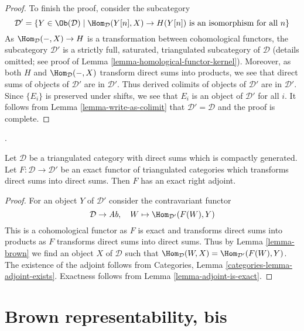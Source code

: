 \begin{proof}
\medskip\noindent
To finish the proof, consider the subcategory
$$
\mathcal{D}' =
\{Y \in \Ob(\mathcal{D}) \mid \Hom_\mathcal{D}(Y[n], X) \to H(Y[n])
\text{ is an isomorphism for all }n\}
$$
As $\Hom_\mathcal{D}(-, X) \to H$ is a transformation between
cohomological functors,
the subcategory $\mathcal{D}'$ is a strictly full, saturated, triangulated
subcategory of $\mathcal{D}$ (details omitted; see proof of
Lemma \ref{lemma-homological-functor-kernel}). Moreover, as both
$H$ and $\Hom_\mathcal{D}(-, X)$ transform direct sums into products,
we see that direct sums of objects of $\mathcal{D}'$ are in $\mathcal{D}'$.
Thus derived colimits of objects of $\mathcal{D}'$ are in $\mathcal{D}'$.
Since $\{E_i\}$ is preserved under shifts, we see that $E_i$
is an object of $\mathcal{D}'$ for all $i$. It follows from
Lemma \ref{lemma-write-as-colimit} that $\mathcal{D}' = \mathcal{D}$
and the proof is complete.
\end{proof}

\begin{proposition}
\label{proposition-brown}
\begin{reference}
\cite[Theorem 4.1]{Neeman-Grothendieck}.
\end{reference}
Let $\mathcal{D}$ be a triangulated category with direct sums which is
compactly generated. Let $F : \mathcal{D} \to \mathcal{D}'$ be an
exact functor of triangulated categories which transforms direct sums
into direct sums. Then $F$ has an exact right adjoint.
\end{proposition}

\begin{proof}
For an object $Y$ of $\mathcal{D}'$ consider the contravariant functor
$$
\mathcal{D} \to \textit{Ab},\quad W \mapsto \Hom_{\mathcal{D}'}(F(W), Y)
$$
This is a cohomological functor as $F$ is exact and transforms direct sums
into products as $F$ transforms direct sums into direct sums. Thus by
Lemma \ref{lemma-brown} we find an object $X$ of $\mathcal{D}$ such that
$\Hom_\mathcal{D}(W, X) = \Hom_{\mathcal{D}'}(F(W), Y)$.
The existence of the adjoint follows from
Categories, Lemma \ref{categories-lemma-adjoint-exists}.
Exactness follows from Lemma \ref{lemma-adjoint-is-exact}.
\end{proof}









\section{Brown representability, bis}
\label{section-brown-bis}

